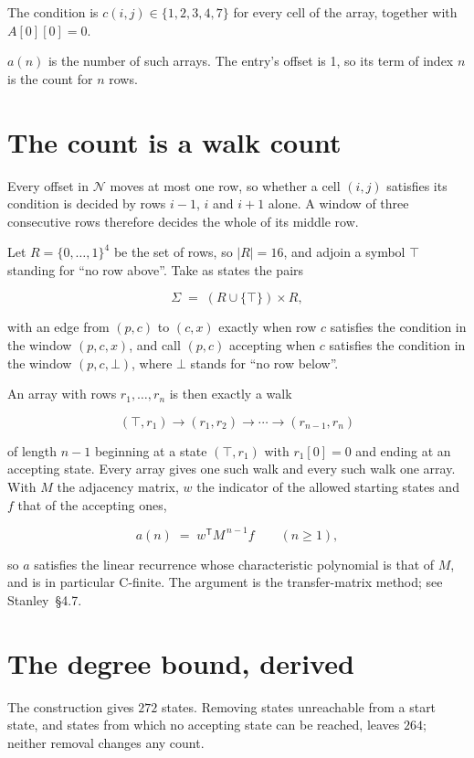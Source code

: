 \documentclass[11pt]{article}
\theoremstyle{definition}
\begin{document}
The condition is $c(i,j) \in \{1, 2, 3, 4, 7\}$ for every cell of the array, together with $A[0][0]=0$.

$a(n)$ is the number of such arrays. The entry's offset is 1, so its term of index $n$ is the count for $n$ rows.

\section{The count is a walk count}

Every offset in $\mathcal{N}$ moves at most one row, so whether a cell $(i,j)$ satisfies its condition is decided by rows $i-1$, $i$ and $i+1$ alone. A window of three consecutive rows therefore decides the whole of its middle row.

Let $R = \{0,\dots,1\}^{4}$ be the set of rows, so $|R| = 16$, and adjoin a symbol $\top$ standing for ``no row above''. Take as states the pairs

\[\Sigma \;=\; (R \cup \{\top\}) \times R,\]

with an edge from $(p,c)$ to $(c,x)$ exactly when row $c$ satisfies the condition in the window $(p,c,x)$, and call $(p,c)$ accepting when $c$ satisfies the condition in the window $(p,c,\bot)$, where $\bot$ stands for ``no row below''.

An array with rows $r_1,\dots,r_n$ is then exactly a walk

\[(\top,r_1) \to (r_1,r_2) \to \cdots \to (r_{n-1},r_n)\]

of length $n-1$ beginning at a state $(\top,r_1)$ with $r_1[0]=0$ and ending at an accepting state. Every array gives one such walk and every such walk one array. With $M$ the adjacency matrix, $w$ the indicator of the allowed starting states and $f$ that of the accepting ones,

\[a(n) \;=\; w^{\mathsf T} M^{\,n-1} f \qquad (n \ge 1),\]

so $a$ satisfies the linear recurrence whose characteristic polynomial is that of $M$, and is in particular C-finite. The argument is the transfer-matrix method; see Stanley~\S4.7.

\section{The degree bound, derived}

The construction gives $272$ states. Removing states unreachable from a start state, and states from which no accepting state can be reached, leaves $264$; neither removal changes any count.
\end{document}
